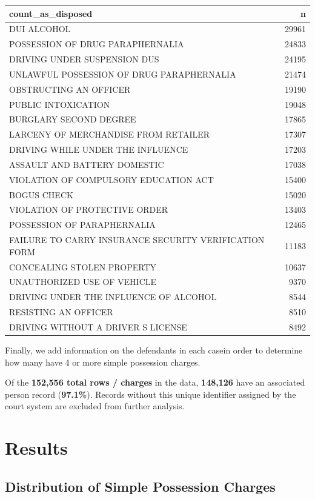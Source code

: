\documentclass[
  letterpaper,
  DIV=11,
  numbers=noendperiod]{scrartcl}
\begin{document}
\begin{longtable*}{lr}
\toprule
count\_as\_disposed & n \\ 
\midrule
DUI ALCOHOL & 29961 \\ 
POSSESSION OF DRUG PARAPHERNALIA & 24833 \\ 
DRIVING UNDER SUSPENSION DUS & 24195 \\ 
UNLAWFUL POSSESSION OF DRUG PARAPHERNALIA & 21474 \\ 
OBSTRUCTING AN OFFICER & 19190 \\ 
PUBLIC INTOXICATION & 19048 \\ 
BURGLARY SECOND DEGREE & 17865 \\ 
LARCENY OF MERCHANDISE FROM RETAILER & 17307 \\ 
DRIVING WHILE UNDER THE INFLUENCE & 17203 \\ 
ASSAULT AND BATTERY DOMESTIC & 17038 \\ 
VIOLATION OF COMPULSORY EDUCATION ACT & 15400 \\ 
BOGUS CHECK & 15020 \\ 
VIOLATION OF PROTECTIVE ORDER & 13403 \\ 
POSSESSION OF PARAPHERNALIA & 12465 \\ 
FAILURE TO CARRY INSURANCE SECURITY VERIFICATION FORM & 11183 \\ 
CONCEALING STOLEN PROPERTY & 10637 \\ 
UNAUTHORIZED USE OF VEHICLE & 9370 \\ 
DRIVING UNDER THE INFLUENCE OF ALCOHOL & 8544 \\ 
RESISTING AN OFFICER & 8510 \\ 
DRIVING WITHOUT A DRIVER S LICENSE & 8492 \\ 
\bottomrule
\end{longtable*}

Finally, we add information on the defendants in each casein order to
determine how many have 4 or more simple possession charges.

Of the \textbf{152,556 total rows / charges} in the data,
\textbf{148,126} have an associated person record (\textbf{97.1\%}).
Records without this unique identifier assigned by the court system are
excluded from further analysis.

\hypertarget{results}{%
\section{Results}\label{results}}

\hypertarget{distribution-of-simple-possession-charges}{%
\subsection{Distribution of Simple Possession
Charges}\label{distribution-of-simple-possession-charges}}
\end{document}
